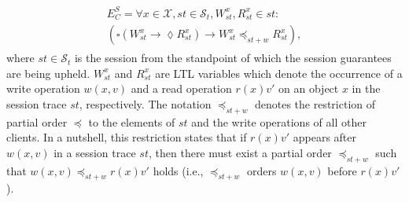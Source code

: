 \documentclass[conference]{IEEEtran}
\begin{document}
	\begin{align}\label{eqn:RYW}
	\begin{split}
	E^S_C =  \forall x \in \mathcal{X}, \mathit{st} \in  \mathcal{S}_t, W_\mathit{st}^x, R_\mathit{st}^x \in \mathit{st}:
	\\ \left( \square \left( W_\mathit{st}^x \rightarrow \lozenge R_\mathit{st}^x \right)
	\rightarrow  W_\mathit{st}^x  \preccurlyeq_{\mathit{st}+w} R_\mathit{st}^x \right),
	\end{split}
	\end{align} where $\mathit{st}\in \mathcal{S}_t$ is the session from the standpoint of which the session guarantees are being upheld.
	$W_\mathit{st}^x$ and $R_\mathit{st}^x$ are LTL variables which denote the occurrence of a write operation $w(x,v)$ and a read operation $r(x){v'}$ on an object $x$ in the session trace $\mathit{st}$, respectively.
	The notation $\preccurlyeq_{\mathit{st}+w}$ denotes the restriction of partial order $\preccurlyeq$ to the elements of $\mathit{st}$ and the write operations of all other clients. %
	In a nutshell, this restriction states that if $r(x){v'}$ %
	appears after $w(x,v)$ in a session trace $\mathit{st}$, %
	then there must exist a partial order $\preccurlyeq_{\mathit{st}+w}$ such that $w(x,v) \preccurlyeq_{\mathit{st}+w} r(x){v'}$ holds (i.e., $\preccurlyeq_{\mathit{st}+w}$ orders $w(x,v)$ before $r(x){v'}$).
	
\end{document}
